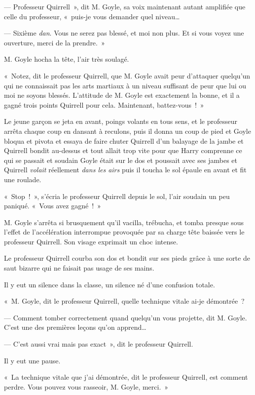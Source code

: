 --- Professeur Quirrell~», dit M. Goyle, sa voix maintenant autant amplifiée que celle du professeur, «~puis-je vous demander quel niveau…

--- Sixième \emph{dan}. Vous ne serez pas blessé, et moi non plus. Et si vous voyez une ouverture, merci de la prendre.~»

M. Goyle hocha la tête, l'air très soulagé.

«~Notez, dit le professeur Quirrell, que M. Goyle avait peur d'attaquer quelqu'un qui ne connaissait pas les arts martiaux à un niveau suffisant de peur que lui ou moi ne soyons blessés. L'attitude de M. Goyle est exactement la bonne, et il a gagné trois points Quirrell pour cela. Maintenant, battez-vous~!~»

Le jeune garçon se jeta en avant, poings volants en tous sens, et le professeur arrêta chaque coup en dansant à reculons, puis il donna un coup de pied et Goyle bloqua et pivota et essaya de faire chuter Quirrell d'un balayage de la jambe et Quirrell bondit au-dessus et tout allait trop vite pour que Harry comprenne ce qui se passait et soudain Goyle était sur le dos et poussait avec ses jambes et Quirrell \emph{volait} réellement \emph{dans les airs} puis il toucha le sol épaule en avant et fit une roulade.

«~Stop~!~», s'écria le professeur Quirrell depuis le sol, l'air soudain un peu paniqué. «~Vous avez gagné~!~»

M. Goyle s'arrêta si brusquement qu'il vacilla, trébucha, et tomba presque sous l'effet de l'accélération interrompue provoquée par sa charge tête baissée vers le professeur Quirrell. Son visage exprimait un choc intense.

Le professeur Quirrell courba son dos et bondit sur ses pieds grâce à une sorte de saut bizarre qui ne faisait pas usage de ses mains.

Il y eut un silence dans la classe, un silence né d'une confusion totale.

«~M. Goyle, dit le professeur Quirrell, quelle technique vitale ai-je démontrée~?

--- Comment tomber correctement quand quelqu'un vous projette, dit M. Goyle. C'est une des premières leçons qu'on apprend…

--- C'est aussi vrai mais pas exact~», dit le professeur Quirrell.

Il y eut une pause.

«~La technique vitale que j'ai démontrée, dit le professeur Quirrell, est comment perdre. Vous pouvez vous rasseoir, M. Goyle, merci.~»

